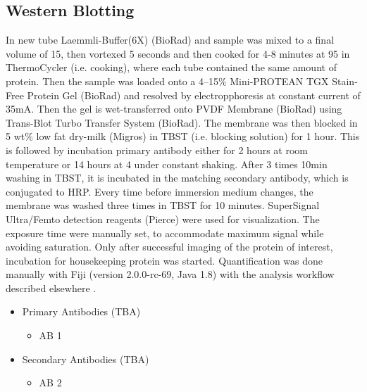 \subsection{Western Blotting}
In new tube Laemmli-Buffer(6X) (BioRad) and sample was mixed to a final volume of 15\mul{}, then  vortexed 5 seconds and then cooked for 4-8 minutes at 95 \degC in ThermoCycler (i.e. cooking), where each tube contained the same amount of protein. Then the sample was loaded onto a 4–15\% Mini-PROTEAN TGX Stain-Free Protein Gel (BioRad) and resolved by electropphoresis at constant current of 35mA. Then the gel is wet-transferred onto PVDF Membrane (BioRad) using Trans-Blot Turbo Transfer System (BioRad). The membrane was then blocked in 5 wt\% low fat dry-milk (Migros) in TBST (i.e. blocking solution) for 1 hour. This is followed by incubation primary antibody either for 2 hours at room temperature or 14 hours at 4 \degC{} under constant shaking. After 3 times 10min washing in TBST, it is incubated in the matching secondary antibody, which is conjugated to HRP. Every time before immersion medium changes, the membrane was washed three times in TBST for 10 minutes. SuperSignal Ultra/Femto  detection reagents (Pierce) were used for visualization. The exposure time were manually set, to accommodate maximum signal while avoiding saturation. Only after successful imaging of the protein of interest, incubation for housekeeping protein was started. Quantification was done manually with Fiji (version 2.0.0-rc-69, Java 1.8) with the analysis workflow described elsewhere \cite{Miller2010}.



\begin{itemize}
    \item Primary Antibodies (TBA)
    \begin{itemize}
		\item AB 1
    \end{itemize}

 	\item Secondary Antibodies (TBA)
    \begin{itemize}
		\item AB 2
    \end{itemize}
\end{itemize}


